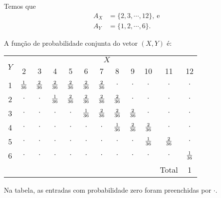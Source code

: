 \begin{example}
    Temos que
    \begin{align*}
        A_X &= \{2, 3, \cdots, 12\},\ \text{e} \\
        A_Y &= \{1, 2,\cdots, 6\}.
    \end{align*}

    A função de probabilidade conjunta do vetor $(X, Y)$ é:
    \begin{center}
        \begin{tabular}{cccccccccccc}
            \toprule
            \multirow{2}{*}{$Y$} & \multicolumn{11}{c}{$X$} \\
            \cmidrule{2-12}
             & 2               & 3 & 4 & 5 & 6 & 7 
                & 8 & 9 & 10 & 11 & 12 \\
            \midrule
            1 & ${\textstyle\frac{1}{36}}$ & ${\textstyle\frac{2}{36}}$ & ${\textstyle\frac{2}{36}}$ 
            & ${\textstyle\frac{2}{36}}$ & ${\textstyle\frac{2}{36}}$ & ${\textstyle\frac{2}{36}}$ 
            & $\cdot$ & $\cdot$ & $\cdot$ 
            & $\cdot$ & $\cdot$ \\
            2 & $\cdot$ & $\cdot$ & ${\textstyle\frac{1}{36}}$
            & ${\textstyle\frac{2}{36}}$ & ${\textstyle\frac{2}{36}}$ & ${\textstyle\frac{2}{36}}$
            & ${\textstyle\frac{2}{36}}$ & $\cdot$ & $\cdot$
            & $\cdot$ & $\cdot$ \\
            3 & $\cdot$ & $\cdot$ & $\cdot$
            & $\cdot$ & ${\textstyle\frac{1}{36}}$ & ${\textstyle\frac{2}{36}}$
            & ${\textstyle\frac{2}{36}}$ & ${\textstyle\frac{2}{36}}$ 
            & $\cdot$ & $\cdot$ & $\cdot$ \\
            4 & $\cdot$ & $\cdot$ & $\cdot$ 
            & $\cdot$ & $\cdot$ & $\cdot$ 
            & ${\textstyle\frac{1}{36}}$ & ${\textstyle\frac{2}{36}}$
            & ${\textstyle\frac{2}{36}}$ & $\cdot$ & $\cdot$ \\
            5 & $\cdot$ & $\cdot$ & $\cdot$ 
            & $\cdot$ & $\cdot$ & $\cdot$
            & $\cdot$ & $\cdot$ & ${\textstyle\frac{1}{36}}$ 
            & ${\textstyle\frac{2}{36}}$ & $\cdot$ \\
            6 & $\cdot$ & $\cdot$ & $\cdot$
            & $\cdot$ & $\cdot$ & $\cdot$
            & $\cdot$ & $\cdot$ & $\cdot$
            & $\cdot$ & ${\textstyle\frac{1}{36}}$ \\
            \bottomrule
            & & & & & & & & & & Total & 1 \\
            \cmidrule{11-12}
        \end{tabular}
    \end{center}

    Na tabela, as entradas com probabilidade zero foram
    preenchidas por $\cdot$.
\end{example}

